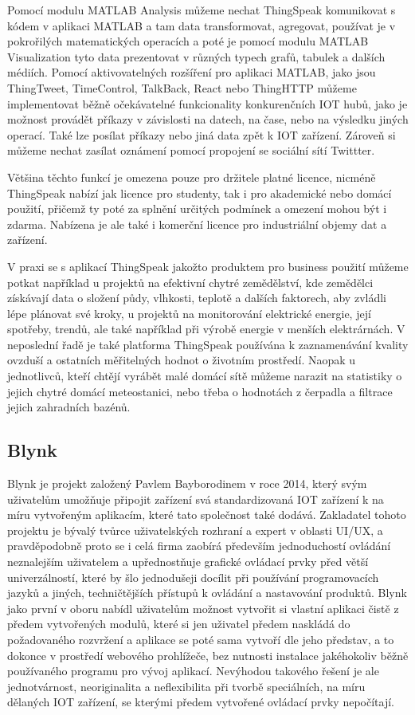 Pomocí modulu MATLAB Analysis můžeme nechat ThingSpeak komunikovat s kódem v aplikaci MATLAB a tam data transformovat, agregovat, používat je v pokrořilých matematických operacích a poté je pomocí modulu MATLAB Visualization tyto data prezentovat v různých typech grafů, tabulek a dalších médiích. Pomocí aktivovatelných rozšíření pro aplikaci MATLAB, jako jsou ThingTweet, TimeControl, TalkBack, React nebo ThingHTTP můžeme implementovat běžně očekávatelné funkcionality konkurenčních IOT hubů, jako je možnost provádět příkazy v závislosti na datech, na čase, nebo na výsledku jiných operací. Také lze posílat příkazy nebo jiná data zpět k IOT zařízení. Zároveň si můžeme nechat zasílat oznámení pomocí propojení se sociální sítí Twittter.

Většina těchto funkcí je omezena pouze pro držitele platné licence, nicméně ThingSpeak nabízí jak licence pro studenty, tak i pro akademické nebo domácí použití, přičemž ty poté za splnění určitých podmínek a omezení mohou být i zdarma. Nabízena je ale také i komerční licence pro industriální objemy dat a zařízení.

V praxi se s aplikací ThingSpeak jakožto produktem pro business použití můžeme potkat například u projektů na efektivní chytré zemědělství, kde zemědělci získávají data o složení půdy, vlhkosti, teplotě a dalších faktorech, aby zvládli lépe plánovat své kroky, u projektů na monitorování elektrické energie, její spotřeby, trendů, ale také například při výrobě energie v menších elektrárnách. V neposlední řadě je také platforma ThingSpeak používána k zaznamenávání kvality ovzduší a ostatních měřitelných hodnot o životním prostředí. Naopak u jednotlivců, kteří chtějí vyrábět malé domácí sítě můžeme narazit na statistiky o jejich chytré domácí meteostanici, nebo třeba o hodnotách z čerpadla a filtrace jejich zahradních bazénů.

\subsection{Blynk}

Blynk je projekt založený Pavlem Bayborodinem v roce 2014, který svým uživatelům umožňuje připojit zařízení svá standardizovaná IOT zařízení k na míru vytvořeným aplikacím, které tato společnost také dodává. Zakladatel tohoto projektu je bývalý tvůrce uživatelských rozhraní a expert v oblasti UI/UX, a pravděpodobně proto se i celá firma zaobírá především jednoduchostí ovládání neznalejším uživatelem a upřednostňuje grafické ovládací prvky před větší univerzálností, které by šlo jednodušeji docílit při používání programovacích jazyků a jiných, techničtějších přístupů k ovládání a nastavování produktů. Blynk jako první v oboru nabídl uživatelům možnost vytvořit si vlastní aplikaci čistě z předem vytvořených modulů, které si jen uživatel předem naskládá do požadovaného rozvržení a aplikace se poté sama vytvoří dle jeho představ, a to dokonce v prostředí webového prohlížeče, bez nutnosti instalace jakéhokoliv běžně používaného programu pro vývoj aplikací. Nevýhodou takového řešení je ale jednotvárnost, neoriginalita a neflexibilita při tvorbě speciálních, na míru dělaných IOT zařízení, se kterými předem vytvořené ovládací prvky nepočítají.

